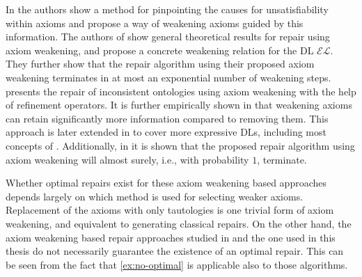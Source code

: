 In \cite{lam2008fine} the authors show a method for pinpointing the causes for unsatisfiability within axioms and propose a way of weakening axioms guided by this information. The authors of \cite{baader2018making} show general theoretical results for repair using axiom weakening, and propose a concrete weakening relation for the DL $\mathcal{EL}$. They further show that the repair algorithm using their proposed axiom weakening terminates in at most an exponential number of weakening steps. \cite{troquard2018repairing} presents the repair of inconsistent ontologies using axiom weakening with the help of refinement operators. It is further empirically shown in \cite{troquard2018repairing} that weakening axioms can retain significantly more information compared to removing them. This approach is later extended in \cite{confalonieri2020towards} to cover more expressive DLs, including most concepts of \SROIQ. Additionally, in \cite{confalonieri2020towards} it is shown that the proposed repair algorithm using axiom weakening will almost surely, i.e., with probability $1$, terminate.

Whether optimal repairs exist for these axiom weakening based approaches depends largely on which method is used for selecting weaker axioms. Replacement of the axioms with only tautologies is one trivial form of axiom weakening, and equivalent to generating classical repairs. On the other hand, the axiom weakening based repair approaches studied in \cite{troquard2018repairing,confalonieri2020towards} and the one used in this thesis do not necessarily guarantee the existence of an optimal repair. This can be seen from the fact that \cref{ex:no-optimal} is applicable also to those algorithms.
